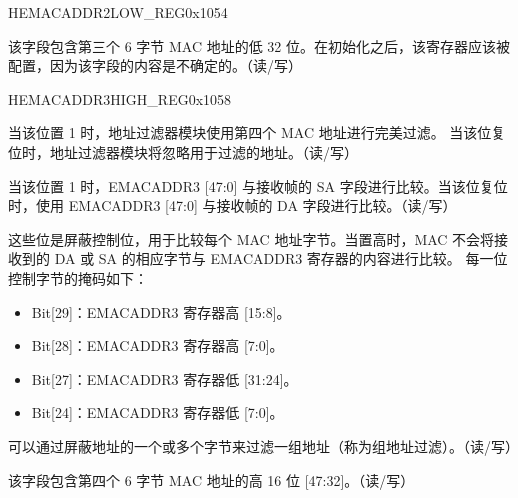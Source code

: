 \begin{register}{H}{EMACADDR2LOW\_REG}{0x1054}\label{regdesc:EMACADDR2LOWREG}
%
\regnewline%
\begin{regdesc}\begin{reglist}
\item [EMACADDR2LOW\_REG]该字段包含第三个 6 字节 MAC 地址的低 32 位。在初始化之后，该寄存器应该被配置，因为该字段的内容是不确定的。（读/写）
\end{reglist}\end{regdesc}
\end{register}

\begin{register}{H}{EMACADDR3HIGH\_REG}{0x1058}\label{regdesc:EMACADDR3HIGHREG}
%
%
%
%
%
\regnewline%
\begin{regdesc}\begin{reglist}
\item [ADDRESS\_ENABLE3]当该位置 1 时，地址过滤器模块使用第四个 MAC 地址进行完美过滤。 当该位复位时，地址过滤器模块将忽略用于过滤的地址。（读/写）
\item [SOURCE\_ADDRESS3]当该位置 1 时，EMACADDR3 [47:0] 与接收帧的 SA 字段进行比较。当该位复位时，使用 EMACADDR3 [47:0] 与接收帧的 DA 字段进行比较。（读/写）
\item [MASK\_BYTE\_CONTROL3] 这些位是屏蔽控制位，用于比较每个 MAC 地址字节。当置高时，MAC 不会将接收到的 DA 或 SA 的相应字节与 EMACADDR3 寄存器的内容进行比较。 每一位控制字节的掩码如下：
\begin{itemize}
\item Bit[29]：EMACADDR3 寄存器高 [15:8]。\item Bit[28]：EMACADDR3 寄存器高 [7:0]。\item Bit[27]：EMACADDR3 寄存器低 [31:24]。\item Bit[24]：EMACADDR3 寄存器低 [7:0]。\end{itemize}
可以通过屏蔽地址的一个或多个字节来过滤一组地址（称为组地址过滤）。（读/写）
\item [MAC\_ADDRESS3\_HI] 该字段包含第四个 6 字节 MAC 地址的高 16 位 [47:32]。（读/写）
\end{reglist}\end{regdesc}
\end{register}



